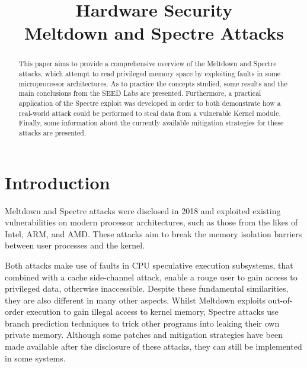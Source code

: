 \documentclass[conference]{IEEEtran}
\begin{document}
\title{Hardware Security \\ Meltdown and Spectre Attacks}


\author{
    \and
    \and
    \and
}


\maketitle

\begin{abstract}
This paper aims to provide a comprehensive overview of the Meltdown and Spectre attacks, which attempt to read privileged memory space by exploiting faults in some microprocessor architectures. As to practice the concepts studied, some results and the main conclusions from the SEED Labs are presented. Furthermore, a practical application of the Spectre exploit was developed in order to both demonstrate how a real-world attack could be performed to steal data from a vulnerable Kernel module. Finally, some information about the currently available mitigation strategies for these attacks are presented.

\end{abstract}

\section{Introduction}
Meltdown and Spectre attacks were disclosed in 2018 and exploited existing vulnerabilities on modern processor architectures, such as those from the likes of Intel, ARM, and AMD. These attacks aim to break the memory isolation barriers between user processes and the kernel.

Both attacks make use of faults in CPU speculative execution subsystems, that combined with a cache side-channel attack, enable a rouge user to gain access to privileged data, otherwise inaccessible. Despite these fundamental similarities, they are also different in many other aspects. Whilst Meltdown exploits out-of-order execution to gain illegal access to kernel memory, Spectre attacks use branch prediction techniques to trick other programs into leaking their own private memory. Although some patches and mitigation strategies have been made available after the disclosure of these attacks, they can still be implemented in some systems.
\end{document}
